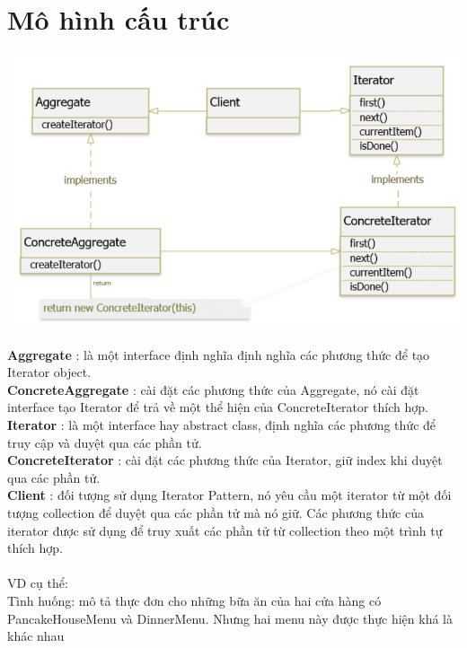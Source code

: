 \section{Mô hình cấu trúc}
\includegraphics[width=\columnwidth]{GALLEYS/images/chapter3/diagram1}\\
\textbf{Aggregate} : là một interface định nghĩa định nghĩa các phương thức để tạo Iterator object.\\
\textbf{ConcreteAggregate} : cài đặt các phương thức của Aggregate, nó cài đặt interface tạo Iterator để trả về một thể hiện của ConcreteIterator thích hợp. \\
\textbf{Iterator} :  là một interface hay abstract class, định nghĩa các phương thức để truy cập và duyệt qua các phần tử. \\
\textbf{ConcreteIterator} :  cài đặt các phương thức của Iterator, giữ index khi duyệt qua các phần tử. \\
\textbf{Client} : đối tượng sử dụng Iterator Pattern, nó yêu cầu một iterator từ một đối tượng collection để duyệt qua các phần tử mà nó giữ. Các phương thức của iterator được sử dụng để truy xuất các phần tử từ collection theo một trình tự thích hợp.\\\\
VD cụ thể:\\
Tình huống: mô tả thực đơn cho những bữa ăn của hai cửa hàng có PancakeHouseMenu và DinnerMenu. Nhưng hai menu này được thực hiện khá là khác nhau
\newpage
